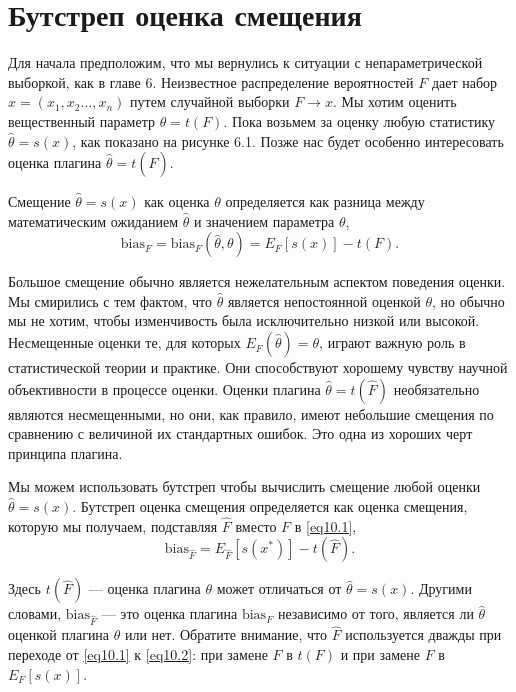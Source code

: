 \section{Бутстреп оценка смещения}

Для начала предположим, что мы вернулись к ситуации с непараметрической выборкой, как в главе 6. Неизвестное распределение вероятностей $F$ дает набор $x = (x_1, x_2 \dots, x_n)$ путем случайной выборки $F \rightarrow x$. Мы хотим оценить вещественный параметр $\theta = t(F)$. Пока возьмем за оценку любую статистику $\hat{\theta} = s(x)$, как показано на рисунке 6.1. Позже нас будет особенно интересовать оценка плагина $\hat{\theta} = t(\hat{F})$.

Смещение $\hat{\theta} = s(x)$ как оценка $\theta$ определяется как разница между математическим ожиданием $\hat{\theta}$ и значением параметра $\theta$,
\begin{equation}\label{eq10.1} 
    \text{bias}_{F} = \text{bias}_{F}(\hat{\theta}, \theta) = E_{F}[s(x)] - t(F).
\end{equation}

Большое смещение обычно является нежелательным аспектом поведения оценки. Мы смирились с тем фактом, что $\hat{\theta}$ является непостоянной оценкой $\theta$, но обычно мы не хотим, чтобы изменчивость была исключительно низкой или высокой. Несмещенные оценки те, для которых $E_{F}(\hat{\theta}) = \theta$, играют важную роль в статистической теории и практике. Они способствуют хорошему чувству научной объективности в процессе оценки. Оценки плагина $\hat{\theta} = t(\hat{F})$ необязательно являются несмещенными, но они, как правило, имеют небольшие смещения по сравнению с величиной их стандартных ошибок. Это одна из хороших черт принципа плагина.

Мы можем использовать бутстреп чтобы вычислить смещение любой оценки $\hat{\theta} = s(x)$. Бутстреп оценка смещения определяется как оценка смещения, которую мы получаем, подставляя $\hat{F}$ вместо $F$ в \ref{eq10.1},
\begin{equation}\label{eq10.2} 
    \text{bias}_{\hat{F}} = E_{\hat{F}}[s(x^{*})] - t(\hat{F}).
\end{equation}

Здесь $t(\hat{F})$ --- оценка плагина $\theta$ может отличаться от $\hat{\theta} = s(x)$. Другими словами, $\text{bias}_{\hat{F}}$ --- это оценка плагина $\text{bias}_{F}$ независимо от того, является ли $\hat{\theta}$ оценкой плагина $\theta$ или нет. Обратите внимание, что $\hat{F}$ используется дважды при переходе от \ref{eq10.1} к \ref{eq10.2}: при замене $F$ в $t(F)$ и при замене $F$ в $E_{F}[s(x)]$.


